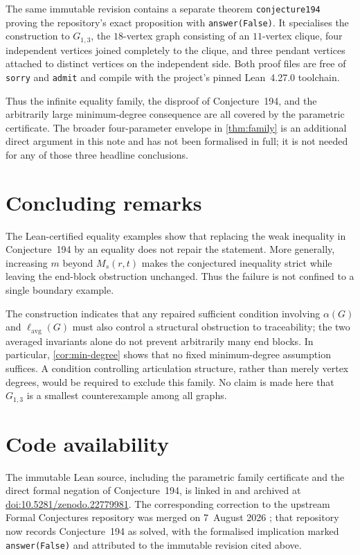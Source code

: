 \documentclass[11pt]{article}
\newcommand{\lavg}{\ell_{\mathrm{avg}}}
\newcommand{\doi}[1]{\href{https://doi.org/#1}{doi:#1}}
\begin{document}
The same immutable revision contains a separate theorem \texttt{conjecture194} proving
the repository's exact proposition with \texttt{answer(False)}.  It specialises the
construction to $G_{1,3}$, the $18$-vertex graph consisting of an $11$-vertex clique,
four independent vertices joined completely to the clique, and three pendant vertices
attached to distinct vertices on the independent side.  Both proof files are free of
\texttt{sorry} and \texttt{admit} and compile with the project's pinned Lean~4.27.0
toolchain.

Thus the infinite equality family, the disproof of Conjecture~194, and the arbitrarily
large minimum-degree consequence are all covered by the parametric certificate.  The
broader four-parameter envelope in \cref{thm:family} is an additional direct argument in
this note and has not been formalised in full; it is not needed for any of those three
headline conclusions.

\section{Concluding remarks}

The Lean-certified equality examples show that replacing the weak inequality in
Conjecture~194 by an equality does not repair the statement.  More generally, increasing
$m$ beyond $M_s(r,t)$ makes the conjectured inequality strict while leaving the end-block
obstruction unchanged.  Thus the failure is not confined to a single boundary example.

The construction indicates that any repaired sufficient condition involving
$\alpha(G)$ and $\lavg(G)$ must also control a structural obstruction to traceability;
the two averaged invariants alone do not prevent arbitrarily many end blocks.  In
particular, \cref{cor:min-degree} shows that no fixed minimum-degree assumption suffices.
A condition controlling articulation structure, rather than merely vertex degrees, would
be required to exclude this family.  No claim is made here that $G_{1,3}$ is a smallest
counterexample among all graphs.

\section*{Code availability}
The immutable Lean source, including the parametric family certificate and the direct
formal negation of Conjecture~194, is linked in \cite{formalconjectures194} and archived
at \doi{10.5281/zenodo.22779981}.  The
corresponding correction to the upstream Formal Conjectures repository was merged on
7~August 2026 \cite{formalconjecturesPR}; that repository now records Conjecture~194 as
solved, with the formalised implication marked \texttt{answer(False)} and attributed to
the immutable revision cited above.
\end{document}

